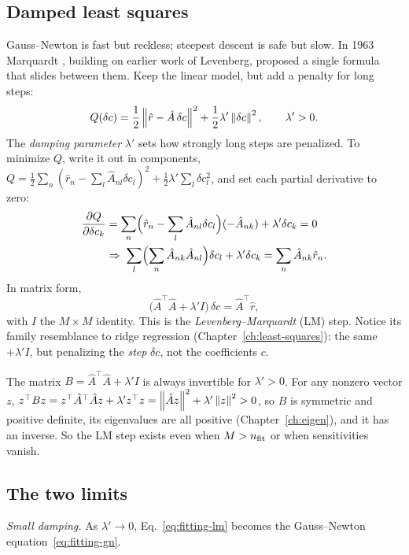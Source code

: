 \subsection{Damped least squares}

Gauss--Newton is fast but reckless; steepest descent is safe but slow. In 1963 Marquardt \cite{marquardt}, building on earlier work of Levenberg, proposed a single formula that slides between them. Keep the linear model, but add a penalty for long steps:
\begin{equation}
Q(\delta c)=\frac12\left\lVert \hat r-\hat A\,\delta c\right\rVert^2+\frac12\lambda'\left\lVert \delta c\right\rVert^2,\qquad\lambda'>0 .
\label{eq:fitting-Q}
\end{equation}
The \emph{damping parameter} $\lambda'$ sets how strongly long steps are penalized. To minimize $Q$, write it out in components, $Q=\tfrac12\sum_n(\hat r_n-\sum_l\hat A_{nl}\delta c_l)^2+\tfrac12\lambda'\sum_l\delta c_l^2$, and set each partial derivative to zero:
\begin{align*}
\frac{\partial Q}{\partial\delta c_k}&=\sum_n\Bigl(\hat r_n-\sum_l\hat A_{nl}\delta c_l\Bigr)(-\hat A_{nk})+\lambda'\delta c_k=0\\
&\Rightarrow\;\sum_l\Bigl(\sum_n\hat A_{nk}\hat A_{nl}\Bigr)\delta c_l+\lambda'\delta c_k=\sum_n\hat A_{nk}\hat r_n .
\end{align*}
In matrix form,
\begin{equation}
\bigl(\hat A^\top\hat A+\lambda'I\bigr)\,\delta c=\hat A^\top\hat r ,
\label{eq:fitting-lm}
\end{equation}
with $I$ the $M\times M$ identity. This is the \emph{Levenberg--Marquardt} (LM) step. Notice its family resemblance to ridge regression (Chapter~\ref{ch:least-squares}): the same $+\lambda' I$, but penalizing the \emph{step} $\delta c$, not the coefficients $c$.

The matrix $B=\hat A^\top\hat A+\lambda'I$ is always invertible for $\lambda'>0$. For any nonzero vector $z$, $z^\top Bz=z^\top\hat A^\top\hat Az+\lambda'z^\top z=\left\lVert \hat Az\right\rVert^2+\lambda'\left\lVert z\right\rVert^2>0$, so $B$ is symmetric and positive definite, its eigenvalues are all positive (Chapter~\ref{ch:eigen}), and it has an inverse. So the LM step exists even when $M>n_{\rm fit}$ or when sensitivities vanish.

\subsection{The two limits}

\emph{Small damping.} As $\lambda'\to0$, Eq.~\eqref{eq:fitting-lm} becomes the Gauss--Newton equation~\eqref{eq:fitting-gn}.

